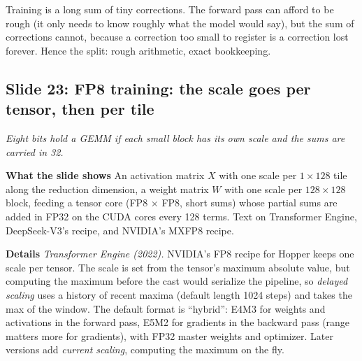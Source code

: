 \documentclass[11pt,letterpaper]{article}
\newcommand{\slide}[3]{%
  \subsection[Slide #1: #2]{Slide #1: #2}%
  {\color{muted}\itshape #3\par}\medskip}
\newcommand{\para}[1]{\medskip\noindent\textbf{#1}\quad}
\newenvironment{intuition}{\begin{tcolorbox}[intuitionbox]}{\end{tcolorbox}}
\begin{document}
\begin{intuition}
Training is a long sum of tiny corrections. The forward pass can afford to be rough (it only needs to know roughly what the model would say), but the sum of corrections cannot, because a correction too small to register is a correction lost forever. Hence the split: rough arithmetic, exact bookkeeping.
\end{intuition}

\slide{23}{FP8 training: the scale goes per tensor, then per tile}{Eight bits hold a GEMM if each small block has its own scale and the sums are carried in 32.}

\para{What the slide shows} An activation matrix $X$ with one scale per $1\times128$ tile along the reduction dimension, a weight matrix $W$ with one scale per $128\times128$ block, feeding a tensor core (FP8 $\times$ FP8, short sums) whose partial sums are added in FP32 on the CUDA cores every 128 terms. Text on Transformer Engine, DeepSeek-V3's recipe, and NVIDIA's MXFP8 recipe.

\para{Details} \emph{Transformer Engine (2022).} NVIDIA's FP8 recipe for Hopper keeps one scale per tensor. The scale is set from the tensor's maximum absolute value, but computing the maximum before the cast would serialize the pipeline, so \emph{delayed scaling} uses a history of recent maxima (default length 1024 steps) and takes the max of the window. The default format is ``hybrid'': E4M3 for weights and activations in the forward pass, E5M2 for gradients in the backward pass (range matters more for gradients), with FP32 master weights and optimizer. Later versions add \emph{current scaling}, computing the maximum on the fly.
\end{document}
